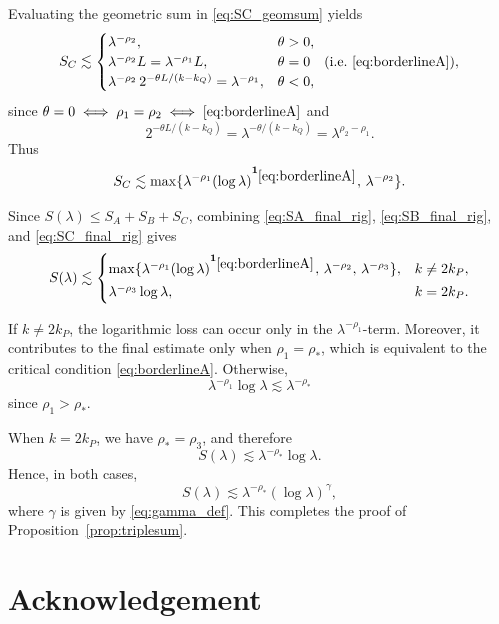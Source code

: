 \documentclass[10pt]{amsart}
\numberwithin{equation}{section}
\theoremstyle{definition}
\theoremstyle{remark}
\theoremstyle{remark}
\begin{document}
	Evaluating the geometric sum in \eqref{eq:SC_geomsum} yields
	\[
	S_C\lesssim
	\begin{cases}
		\lambda^{-\rho_2},&\theta>0,\\
		\lambda^{-\rho_2}L=\lambda^{-\rho_1}L,&\theta=0\quad(\text{i.e.\ }\eqref{eq:borderlineA}),\\
		\lambda^{-\rho_2}\,2^{-\theta L/(k-k_Q)}=\lambda^{-\rho_1},&\theta<0,
	\end{cases}
	\]
	since $\theta=0\iff \rho_1=\rho_2\iff \eqref{eq:borderlineA}$ and
	\[
	2^{-\theta L/(k-k_Q)}
	=
	\lambda^{-\theta/(k-k_Q)}
	=
	\lambda^{\rho_2-\rho_1}.
	\]
	Thus
	\begin{equation}\label{eq:SC_final_rig}
		S_C\lesssim
		\max\{
		\lambda^{-\rho_1}(\log\lambda)^{\mathbf 1_{\eqref{eq:borderlineA}}},
		\,\lambda^{-\rho_2}
		\}.
	\end{equation}
	
	Since $S(\lambda)\le S_A+S_B+S_C$, combining \eqref{eq:SA_final_rig}, \eqref{eq:SB_final_rig}, and \eqref{eq:SC_final_rig} gives
	\[
	S(\lambda)\lesssim
	\begin{cases}
		\max\{\lambda^{-\rho_1}(\log\lambda)^{\mathbf 1_{\eqref{eq:borderlineA}}},\,\lambda^{-\rho_2},\,\lambda^{-\rho_3}\},&k\neq 2k_P,\\[2pt]
		\lambda^{-\rho_3}\log\lambda,&k=2k_P.
	\end{cases}
	\]
	
    
    If $k\neq2k_P$, the logarithmic loss can occur only in the
    $\lambda^{-\rho_1}$-term.
    Moreover, it contributes to the final estimate only when
    $\rho_1=\rho_*$, which is equivalent to the critical condition
    \eqref{eq:borderlineA}.
    Otherwise,
    \[
    \lambda^{-\rho_1}\log\lambda
    \lesssim
    \lambda^{-\rho_*}
    \]
    since $\rho_1>\rho_*$.

    When $k=2k_P$, we have $\rho_*=\rho_3$, and therefore
    \[
    S(\lambda)
    \lesssim
    \lambda^{-\rho_*}\log\lambda.
    \]
    Hence, in both cases,
    \[
    S(\lambda)
    \lesssim
    \lambda^{-\rho_*}(\log\lambda)^\gamma,
    \]
    where \(\gamma\) is given by \eqref{eq:gamma_def}.
	This completes the proof of Proposition~\ref{prop:triplesum}.





    \section*{Acknowledgement}
\end{document}
